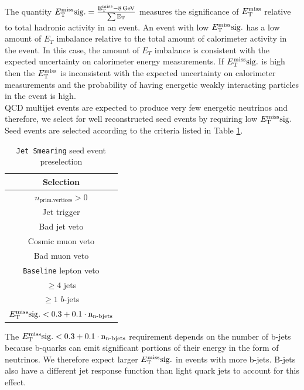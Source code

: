 \indent The quantity $E_{\mathrm{T}}^{\mathrm{miss}}\rm{sig.}=\frac{ E_{\mathrm{T}}^{\mathrm{miss}}-8\rm{\,GeV} } {\sum E_\mathrm{T} }$ measures the significance of $E_{\mathrm{T}}^{\mathrm{miss}}$ relative to total hadronic activity in an event.  An event with low $E_{\mathrm{T}}^{\mathrm{miss}}\rm{sig.}$ has a low amount of $E_T$ imbalance relative to the total amount of calorimeter activity in the event.  In this case, the amount of $E_T$ imbalance is consistent with the expected uncertainty on calorimeter energy measurements.  If $E_{\mathrm{T}}^{\mathrm{miss}}\rm{sig.}$ is high then the $E_{\mathrm{T}}^{\mathrm{miss}}$ is inconsistent with the expected uncertainty on calorimeter measurements and the probability of having energetic weakly interacting particles in the event is high.   \\

\indent QCD multijet events are expected to produce very few energetic neutrinos and therefore, we select for well reconstructed seed events by requiring low $E_{\mathrm{T}}^{\mathrm{miss}}\rm{sig.}$ Seed events are selected according to the criteria listed in Table \ref{tb:seed_events_presel}. \\

 \begin{table}[h!]
 \caption{{\tt Jet Smearing} seed event preselection}
 \label{tb:seed_events_presel}
 \begin{center}
 \begin{tabular}{c} \hline
   Selection \\ \hline
   $n_\mathrm{prim. vertices} > 0$\\
   Jet trigger\\
   Bad jet veto\\
   Cosmic muon veto\\
   Bad muon veto\\
   {\tt Baseline} lepton veto\\
   $\geq 4$ jets\\
   $\geq 1$ $b$-jets\\
   $E_{\mathrm{T}}^{\mathrm{miss}}\rm{sig.} < 0.3 + 0.1\cdot n_{\textup{n-bjets}}$ \\ \hline
 \end{tabular}
 \end{center}
 \end{table}

\indent The $E_{\mathrm{T}}^{\mathrm{miss}}\rm{sig.} < 0.3 + 0.1\cdot n_{\textup{n-bjets}}$ requirement depends on the number of b-jets because b-quarks can emit significant portions of their energy in the form of neutrinos.  We therefore expect larger $E_{\mathrm{T}}^{\mathrm{miss}}\rm{sig.}$ in events with more b-jets.  B-jets also have a different jet response function than light quark jets to account for this effect. \\

